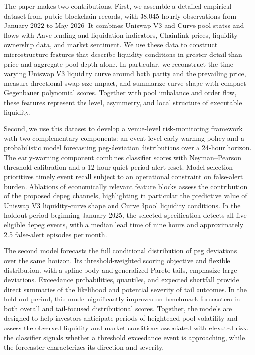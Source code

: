 \documentclass[a4paper,fleqn]{cas-sc}
\begin{document}
The paper makes two contributions. First, we assemble a detailed empirical dataset from public blockchain records, with 38,045 hourly observations from January 2022 to May 2026. It combines Uniswap V3 and Curve pool states and flows with Aave lending and liquidation indicators, Chainlink prices, liquidity ownership data, and market sentiment. We use these data to construct microstructure features that describe liquidity conditions in greater detail than price and aggregate pool depth alone. In particular, we reconstruct the time-varying Uniswap V3 liquidity curve around both parity and the prevailing price, measure directional swap-size impact, and summarize curve shape with compact Gegenbauer polynomial scores. Together with pool imbalance and order flow, these features represent the level, asymmetry, and local structure of executable
liquidity.

Second, we use this dataset to develop a venue-level risk-monitoring framework with two complementary components: an event-level early-warning policy and a probabilistic model forecasting peg-deviation distributions over a 24-hour horizon. The early-warning component combines classifier scores with Neyman--Pearson threshold calibration and a 12-hour quiet-period alert reset. Model selection prioritizes timely event recall subject to an operational constraint on false-alert burden. Ablations of economically relevant feature blocks assess the contribution of the proposed depeg channels, highlighting in particular the predictive value of Uniswap V3 liquidity-curve shape and Curve 3pool liquidity conditions. In the holdout period beginning January 2025, the selected specification detects all five eligible depeg events, with a median lead time of nine hours and approximately 2.5 false-alert episodes per month.

The second model forecasts the full conditional distribution of peg deviations over the same horizon. Its threshold-weighted scoring objective and flexible distribution, with a spline body and generalized Pareto tails, emphasize large deviations. Exceedance probabilities, quantiles, and expected shortfall provide direct summaries of the likelihood and potential severity of tail outcomes. In the held-out period, this model significantly improves on benchmark forecasters in both overall and tail-focused distributional scores. Together, the models are designed to help investors anticipate periods of heightened pool volatility and assess the observed liquidity and market conditions associated with elevated risk: the classifier signals whether a threshold exceedance event is approaching, while the forecaster characterizes its direction and severity.
\end{document}
